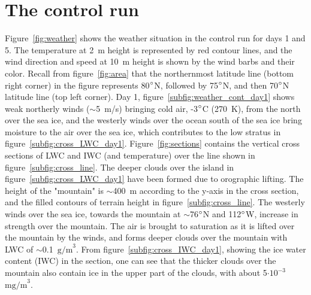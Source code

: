 \section{The control run}
Figure~\ref{fig:weather} shows the weather situation in the control run for days 1 and 5. The temperature at 2~m height is represented by red contour lines, and the wind direction and speed at 10~m height is shown by the 
wind barbs and their color. Recall from figure~\ref{fig:area} that the northernmost latitude line (bottom right corner) in the figure represents 80$\degree$N, followed by 75$\degree$N, and then 70$\degree$N latitude line (top left corner). Day 1, figure~\ref{subfig:weather_cont_day1} shows weak northerly winds ($\sim$5~m/s) bringing cold air, -3$\degree$C (270~K), from the north over the sea ice, and the westerly winds over the ocean south of the sea ice bring moisture to the air over the sea ice, which contributes to the low stratus in figure~\ref{subfig:cross_LWC_day1}. Figure~\ref{fig:sections} contains the vertical cross sections of LWC and IWC (and temperature) over the line shown in figure~\ref{subfig:cross_line}. The deeper clouds over the island in figure~\ref{subfig:cross_LWC_day1} have been formed due to orographic lifting. The height of the "mountain" is $\sim$400~m according to the y-axis in the cross section, and the filled contours of terrain height in figure~\ref{subfig:cross_line}. The westerly winds over the sea ice, towards the mountain at $\sim$76$\degree$N and 112$\degree$W, increase in strength over the mountain. The air is brought to saturation as it is lifted over the mountain by the winds, and forms deeper clouds over the mountain with LWC of $\sim$0.1~$\text{g/m}^3$.  From figure~\ref{subfig:cross_IWC_day1}, showing the ice water content (IWC) in the section, one can see that the thicker clouds over the mountain also contain ice in the upper part of the clouds, with about 5$\cdot\text{10}^{-3}$~$\text{mg/m}^3$. 

